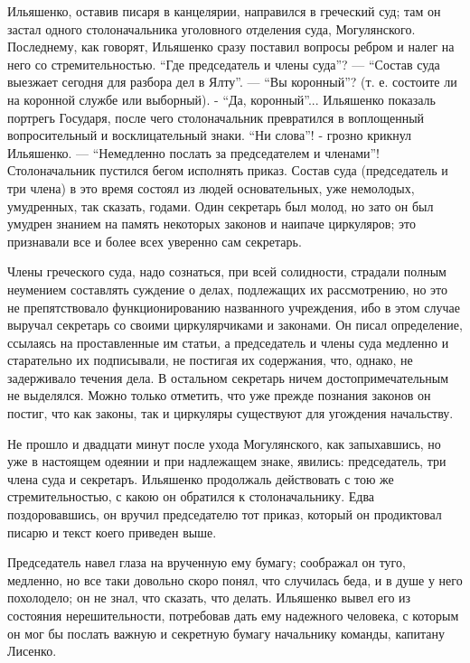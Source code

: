 \documentclass[a4paper,20pt]{article}
\begin{document}
Ильяшенко, оставив писаря в канцелярии, направился
в греческий суд; там он застал одного столоначальника
уголовного отделения суда, Могулянского. Последнему, как
говорят, Ильяшенко сразу поставил вопросы ребром и
налег на него со стремительностью. ``Где председатель и
члены суда''? — ``Состав суда выезжает сегодня для разбора
дел в Ялту''. — ``Вы коронный''? (т. е. состоите ли на 
коронной службе или выборный). - ``Да, коронный''... Ильяшенко
показаль портрегь Государя, после чего столоначальник
превратился в воплощенный вопросительный и восклицательный знаки. ``Ни слова''! - грозно крикнул Ильяшенко. —
``Немедленно послать за председателем и членами''! Столоначальник пустился
бегом исполнять приказ. Состав суда (председатель и три члена) в это
время состоял из людей основательных, уже немолодых, умудренных, так
сказать, годами. Один секретарь был молод, но зато он был умудрен
знанием на память некоторых законов и наипаче циркуляров; это
признавали все и более всех уверенно сам секретарь.

Члены греческого суда, надо сознаться, при всей солидности, страдали полным
неумением составлять суждение о делах, подлежащих их рассмотрению, но
это не препятствовало функционированию названного учреждения, ибо в
этом случае выручал секретарь со своими циркулярчиками и законами. Он
писал определение, ссылаясь на проставленные им статьи, а председатель
и члены суда медленно и старательно их подписывали, не постигая их
содержания, что, однако, не задерживало течения дела. В остальном
секретарь ничем достопримечательным не выделялся.  Можно только
отметить, что уже прежде познания законов он постиг, что как законы,
так и циркуляры существуют для угождения начальству.

Не прошло и двадцати минут после ухода Могулянского, как запыхавшись, но уже в
настоящем одеянии и при надлежащем знаке, явились: председатель, три
члена суда и секретаръ. Ильяшенко продолжаль действовать с тою же
стремительностью, с какою он обратился к столоначальнику. Едва
поздоровавшись, он вручил председателю тот приказ, который он
продиктовал писарю и текст коего приведен выше.

Председатель навел глаза на врученную ему бумагу; соображал он туго, медленно, но все таки довольно
скоро понял, что случилась беда, и в душе у него похолодело;
он не знал, что сказать, что делать. Ильяшенко вывел
его из состояния нерешительности, потребовав дать ему
надежного человека, с которым он мог бы послать важную и секретную бумагу
начальнику команды, капитану Лисенко.
\end{document}
